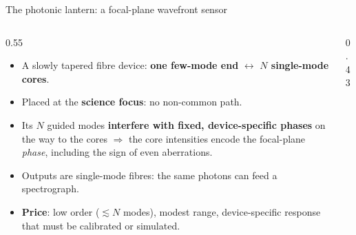 \documentclass[aspectratio=169,10pt]{beamer}
\begin{document}
\begin{frame}{The photonic lantern: a focal-plane wavefront sensor}
\begin{columns}[T]
\begin{column}{0.55\textwidth}
\begin{itemize}
    \item A slowly tapered fibre device: \textbf{one few-mode end} $\leftrightarrow$
          \textbf{$N$ single-mode cores}.
    \item Placed at the \textbf{science focus}: no non-common path.
    \item Its $N$ guided modes \textbf{interfere with fixed, device-specific phases}
          on the way to the cores $\Rightarrow$ the core intensities encode the focal-plane
          \emph{phase}, including the sign of even aberrations.
    \item Outputs are single-mode fibres: the same photons can feed a spectrograph.
    \item \textbf{Price}: low order ($\lesssim N$ modes), modest range, device-specific
          response that must be calibrated or simulated.
\end{itemize}
\end{column}
\begin{column}{0.43\textwidth}
\centering
{}
\end{column}
\end{columns}
\end{frame}
\end{document}
